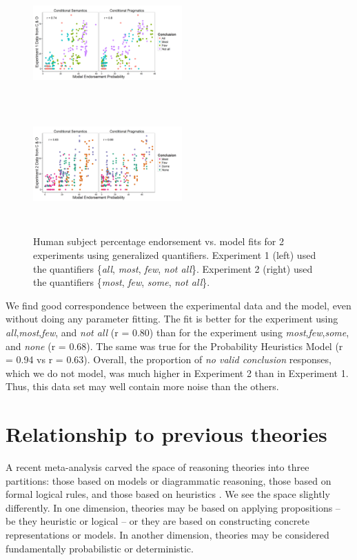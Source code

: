 \documentclass[10pt,letterpaper]{article}
\begin{document}
\begin{figure}[htp]
  \includegraphics[width=0.51\textwidth,height=4.5cm]{fig3a_multiScatter_AMFO_n6_alphabefore1}
    \includegraphics[width=0.51\textwidth,height=4.5cm]{fig3b_multiScatter_MFIE_n6_alphabefore1}
      \caption{Human subject percentage endorsement vs. model fits for 2 experiments using generalized quantifiers. Experiment 1 (left) used the quantifiers \{\emph{all}, \emph{most}, \emph{few}, \emph{not all}\}. Experiment 2 (right) used the quantifiers \{\emph{most}, \emph{few}, \emph{some}, \emph{not all}\}.}
  \label{fig:mfScatter}
\end{figure}


We find good correspondence between the experimental data and the model, even without doing any parameter fitting. The fit is better for the experiment using \emph{all},\emph{most},\emph{few}, and \emph{not all} (r = 0.80) than for the experiment using \emph{most},\emph{few},\emph{some}, and \emph{none} (r = 0.68). The same was true for the Probability Heuristics Model (r = 0.94 vs r = 0.63). Overall, the proportion of \emph{no valid conclusion} responses, which we do not model, was much higher in Experiment 2 than in Experiment 1. Thus, this data set may well contain more noise than the others. 




\section{Relationship to previous theories}

A recent meta-analysis carved the space of reasoning theories into three partitions: those based on models or diagrammatic reasoning, those based on formal logical rules, and those based on heuristics \cite{Khemlani2012}. We see the space slightly differently. In one dimension, theories may be based on applying propositions -- be they heuristic or logical -- or they are based on constructing concrete representations or models. In another dimension, theories may be considered fundamentally probabilistic or deterministic. 
\end{document}
